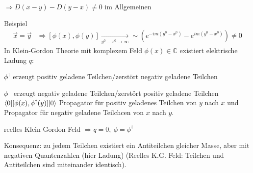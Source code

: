 $\Rightarrow D(x-y) - D(y-x) \neq 0 $ im Allgemeinen

Beispiel 
	\begin{align*}
		\vec{x} = \vec{y} &\Rightarrow [\phi(x), \phi(y)]
		\underset{y^0 -x^0 \rightarrow \infty}{\longrightarrow} \sim
		\left(e^{-im(y^0 -x^0)} - e^{im (y^0 -x^0)}\right) \neq 0
	\end{align*}	
In Klein-Gordon Theorie mit komplexem Feld $\phi (x) \in \mathds{C}$ existiert elektrische Ladung $q$:

$\phi^\dagger$ erzeugt positiv geladene Teilchen/zerstört negativ geladene Teilchen

$\phi$ ~erzeugt negativ geladene Teilchen/zerstört positiv geladene Teilchen
\\
$\braket{0 | [\phi(x), \phi^\dagger(y)] | 0}$ Propagator für positiv geladenes Teilchen von $y$ nach $x$ und Propagator für negativ geladene Teilchcen von $x$ nach $y$.

reelles Klein Gordon Feld $\Rightarrow q = 0,~\phi = \phi^\dagger$ 

Konsequenz: zu jedem Teilchen existiert ein Antiteilchen gleicher Masse, aber mit negativen Quantenzahlen (hier Ladung) (Reelles K.G. Feld: Teilchen und Antiteilchen sind miteinander identisch).